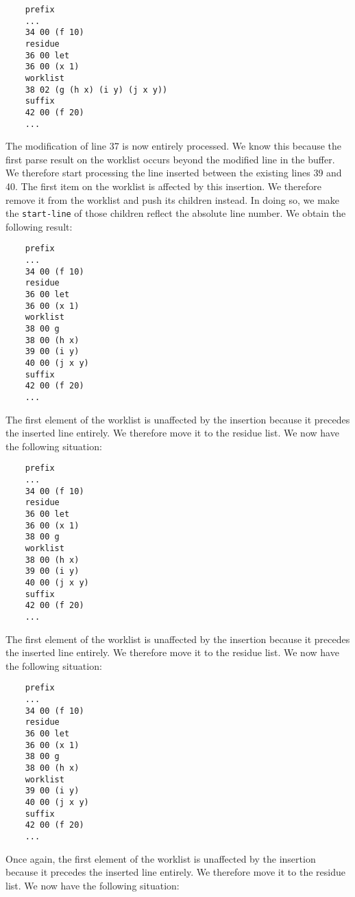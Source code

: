 {\small\begin{verbatim}
    prefix
    ...
    34 00 (f 10)
    residue
    36 00 let
    36 00 (x 1)
    worklist
    38 02 (g (h x) (i y) (j x y))
    suffix
    42 00 (f 20)
    ...
\end{verbatim}}

The modification of line 37 is now entirely processed.  We know this
because the first parse result on the worklist occurs beyond the
modified line in the buffer.  We therefore start processing the line
inserted between the existing lines 39 and 40.  The first item on the
worklist is affected by this insertion.  We therefore remove it from
the worklist and push its children instead.  In doing so, we make the
\texttt{start-line} of those children reflect the absolute line
number.  We obtain the following result:

{\small\begin{verbatim}
    prefix
    ...
    34 00 (f 10)
    residue
    36 00 let
    36 00 (x 1)
    worklist
    38 00 g
    38 00 (h x)
    39 00 (i y)
    40 00 (j x y)
    suffix
    42 00 (f 20)
    ...
\end{verbatim}}

The first element of the worklist is unaffected by the insertion
because it precedes the inserted line entirely.  We therefore move it
to the residue list.  We now have the following situation:

{\small\begin{verbatim}
    prefix
    ...
    34 00 (f 10)
    residue
    36 00 let
    36 00 (x 1)
    38 00 g
    worklist
    38 00 (h x)
    39 00 (i y)
    40 00 (j x y)
    suffix
    42 00 (f 20)
    ...
\end{verbatim}}

The first element of the worklist is unaffected by the insertion
because it precedes the inserted line entirely.  We therefore move it
to the residue list.  We now have the following situation:

{\small\begin{verbatim}
    prefix
    ...
    34 00 (f 10)
    residue
    36 00 let
    36 00 (x 1)
    38 00 g
    38 00 (h x)
    worklist
    39 00 (i y)
    40 00 (j x y)
    suffix
    42 00 (f 20)
    ...
\end{verbatim}}

Once again, the first element of the worklist is unaffected by the
insertion because it precedes the inserted line entirely.  We
therefore move it to the residue list.  We now have the following
situation:

